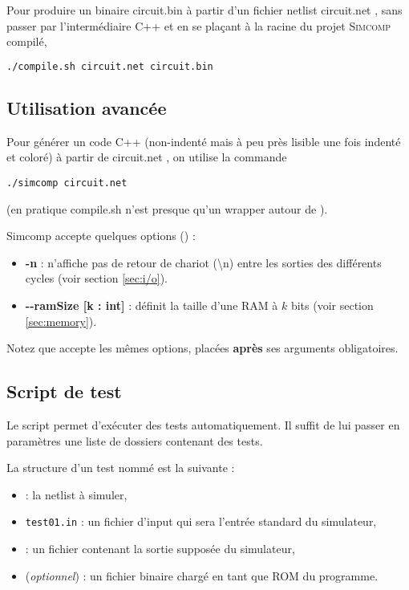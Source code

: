 \documentclass[11pt,a4paper]{article}
\begin{document}
Pour produire un binaire \og circuit.bin \fg{} à partir d'un fichier netlist \og circuit.net \fg{}, sans passer par l'intermédiaire C++ et en se plaçant à la racine du projet \textsc{Simcomp} compilé,
\begin{lstlisting}[language=bash]
./compile.sh circuit.net circuit.bin
\end{lstlisting}

\subsection{Utilisation avancée}

Pour générer un code C++ (non-indenté mais à peu près lisible une fois indenté et coloré) à partir de \og circuit.net \fg{}, on utilise la commande
\begin{lstlisting}
./simcomp circuit.net
\end{lstlisting}
(en pratique compile.sh n'est presque qu'un wrapper autour de ).
\vspace{1em}

Simcomp accepte quelques options () :
\begin{itemize}
\item \textbf{-n} : n'affiche pas de retour de chariot (\textbackslash n) entre les sorties des différents cycles (voir section \ref{sec:i/o}).
\item \textbf{-{}-ramSize [k : int]} : définit la taille d'une RAM à $k$ bits (voir section \ref{sec:memory}).
\end{itemize}
\vspace{1em}

Notez que  accepte les mêmes options, placées \textbf{après} ses arguments obligatoires.

\subsection{Script de test}

Le script  permet d'exécuter des tests automatiquement. Il suffit de lui passer en paramètres une liste de dossiers contenant des tests.

La structure d'un test nommé  est la suivante :
\begin{itemize}
\item {} : la netlist à simuler,
\item \lstinline`test01.in` : un fichier d'input qui sera l'entrée standard du simulateur,
\item {} : un fichier contenant la sortie supposée du simulateur,
\item {} (\emph{optionnel}) : un fichier binaire chargé en tant que ROM du programme.
\end{itemize}
\end{document}
